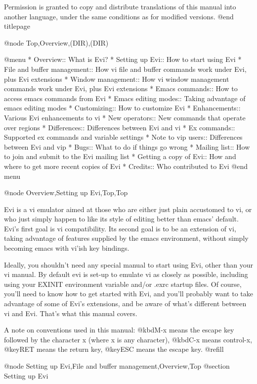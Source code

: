 Permission is granted to copy and distribute translations of this manual
into another language, under the same conditions as for modified versions.
@end titlepage

@node Top,Overview,(DIR),(DIR)

@menu
* Overview::			What is Evi?
* Setting up Evi::		How to start using Evi
* File and buffer management::	How vi file and buffer commands
				work under Evi, plus Evi extensions
* Window management::		How vi window management commands
				work under Evi, plus Evi extensions
* Emacs commands::		How to access emacs commands from Evi
* Emacs editing modes::		Taking advantage of emacs editing modes
* Customizing::			How to customize Evi
* Enhancements::		Various Evi enhancements to vi
* New operators::		New commands that operate over regions
* Differences::			Differences between Evi and vi
* Ex commands::			Supported ex commands and variable settings
* Note to vip users::		Differences between Evi and vip
* Bugs::			What to do if things go wrong
* Mailing list::		How to join and submit to the Evi mailing list
* Getting a copy of Evi::	How and where to get more recent copies of Evi
* Credits::			Who contributed to Evi
@end menu

@node Overview,Setting up Evi,Top,Top

Evi is a vi emulator aimed at those who are either just plain accustomed
to vi, or who just simply happen to like its style of editing better
than emacs' default.  Evi's first goal is vi compatibility.  Its second
goal is to be an extension of vi, taking advantage of features supplied
by the emacs environment, without simply becoming emacs with vi'ish key
bindings.

Ideally, you shouldn't need any special manual to start using Evi, other
than your vi manual.  By default evi is set-up to emulate vi as closely
as possible, including using your EXINIT environment variable and/or
.exrc startup files.  Of course, you'll need to know how to get started
with Evi, and you'll probably want to take advantage of some of Evi's
extensions, and be aware of what's different between vi and Evi.  That's
what this manual covers.

A note on conventions used in this manual: @kbd{M-x} means the escape
key followed by the character x (where x is any character), @kbd{C-x}
means control-x, @key{RET} means the return key,
@key{ESC} means the escape key. @refill

@node Setting up Evi,File and buffer management,Overview,Top
@section Setting up Evi

